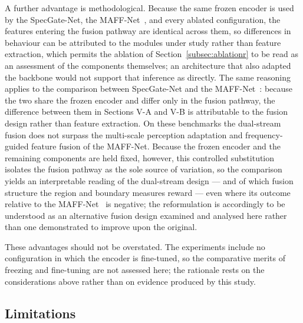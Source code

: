 A further advantage is methodological. Because the same frozen encoder is used by the SpecGate-Net, the MAFF-Net~\cite{ref15}, and every ablated configuration, the features entering the fusion pathway are identical across them, so differences in behaviour can be attributed to the modules under study rather than feature extraction, which permits the ablation of Section~\ref{subsec:ablationr} to be read as an assessment of the components themselves; an architecture that also adapted the backbone would not support that inference as directly. The same reasoning applies to the comparison between SpecGate-Net and the MAFF-Net~\cite{ref15}: because the two share the frozen encoder and differ only in the fusion pathway, the difference between them in Sections V-A and V-B is attributable to the fusion design rather than feature extraction. On these benchmarks the dual-stream fusion does not surpass the multi-scale perception adaptation and frequency-guided feature fusion of the MAFF-Net. Because the frozen encoder and the remaining components are held fixed, however, this controlled substitution isolates the fusion pathway as the sole source of variation, so the comparison yields an interpretable reading of the dual-stream design --- and of which fusion structure the region and boundary measures reward --- even where its outcome relative to the MAFF-Net~\cite{ref15} is negative; the reformulation is accordingly to be understood as an alternative fusion design examined and analysed here rather than one demonstrated to improve upon the original.

These advantages should not be overstated. The experiments include no configuration in which the encoder is fine-tuned, so the comparative merits of freezing and fine-tuning are not assessed here; the rationale rests on the considerations above rather than on evidence produced by this study.

\subsection{Limitations}
\label{subsec:limitations}

